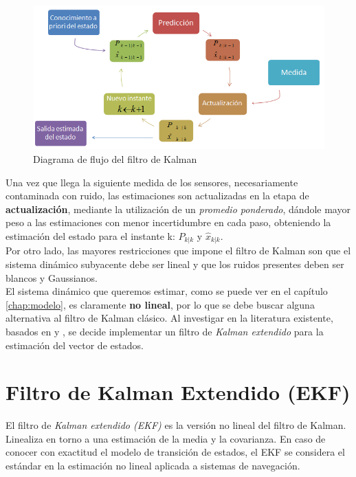 \documentclass[main]{subfiles}
\begin{document}
\begin{figure}[h!]
	\centering
	\includegraphics[width=.8\textwidth]{./pics_kalman/kal.png}
	\caption{Diagrama de flujo del filtro de Kalman}
	\label{fig:kal}
\end{figure}

Una vez que llega la siguiente medida de los sensores, necesariamente contaminada con ruido, las estimaciones son actualizadas en la etapa de \textbf{actualización}, mediante la utilización de un \emph{promedio ponderado}, dándole mayor peso a las estimaciones con menor incertidumbre en cada paso, obteniendo la estimación del estado para el instante k: $P_{k|k}$ y $\hat{x}_{k|k}$.\\

Por otro lado, las mayores restricciones que impone el filtro de Kalman son que el sistema dinámico subyacente debe ser lineal y que los ruidos presentes deben ser blancos y Gaussianos.\\

El sistema dinámico que queremos estimar, como se puede ver en el capítulo \ref{chap:modelo}, es claramente \textbf{no lineal}, por lo que se debe buscar alguna alternativa al filtro de Kalman clásico. Al investigar en la literatura existente, basados en \cite{bib:kalman} y \cite{bib:kalman2}, se decide implementar un filtro de \emph{Kalman extendido} para la estimación del vector de estados.

\section{Filtro de Kalman Extendido (EKF)}

El filtro de \emph{Kalman extendido (EKF)} es la versión no lineal del filtro de Kalman. Linealiza en torno a una estimación de la media y la covarianza. En caso de conocer con exactitud el modelo de transición de estados, el EKF se considera el estándar en la estimación no lineal aplicada a sistemas de navegación.\\
\end{document}
